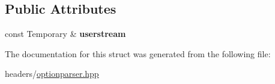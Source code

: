 \subsection*{Public Attributes}
\begin{DoxyCompactItemize}
\item 
\mbox{\label{structoption_1_1PrintUsageImplementation_1_1TemporaryWriter_a91d54cfcea7bb4072072506d46cc2cc8}} 
const Temporary \& {\bfseries userstream}
\end{DoxyCompactItemize}


The documentation for this struct was generated from the following file\+:\begin{DoxyCompactItemize}
\item 
headers/\hyperlink{optionparser_8hpp}{optionparser.\+hpp}\end{DoxyCompactItemize}
